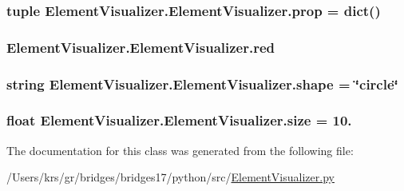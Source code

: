 \subsubsection[{prop}]{\setlength{\rightskip}{0pt plus 5cm}tuple Element\+Visualizer.\+Element\+Visualizer.\+prop = dict()\hspace{0.3cm}{\ttfamily [static]}}\label{class_element_visualizer_1_1_element_visualizer_a78cdd9cc35942c1dcee2c8218a27cd43}
\hypertarget{class_element_visualizer_1_1_element_visualizer_a06e5ddbc77f8d3b1b36d1cd21dd7e970}{}
\subsubsection[{red}]{\setlength{\rightskip}{0pt plus 5cm}Element\+Visualizer.\+Element\+Visualizer.\+red}\label{class_element_visualizer_1_1_element_visualizer_a06e5ddbc77f8d3b1b36d1cd21dd7e970}
\hypertarget{class_element_visualizer_1_1_element_visualizer_ac65e55e81d3cd3aafa4ff3f236ce3298}{}
\subsubsection[{shape}]{\setlength{\rightskip}{0pt plus 5cm}string Element\+Visualizer.\+Element\+Visualizer.\+shape = \char`\"{}circle\char`\"{}\hspace{0.3cm}{\ttfamily [static]}}\label{class_element_visualizer_1_1_element_visualizer_ac65e55e81d3cd3aafa4ff3f236ce3298}
\hypertarget{class_element_visualizer_1_1_element_visualizer_ab4c0c8c7f0d19673eb6a75ddc06e14f9}{}
\subsubsection[{size}]{\setlength{\rightskip}{0pt plus 5cm}float Element\+Visualizer.\+Element\+Visualizer.\+size = 10.\hspace{0.3cm}{\ttfamily [static]}}\label{class_element_visualizer_1_1_element_visualizer_ab4c0c8c7f0d19673eb6a75ddc06e14f9}


The documentation for this class was generated from the following file\+:\begin{DoxyCompactItemize}
\item 
/\+Users/krs/gr/bridges/bridges17/python/src/\hyperlink{_element_visualizer_8py}{Element\+Visualizer.\+py}\end{DoxyCompactItemize}
